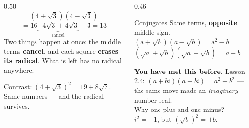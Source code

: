 \documentclass[aspectratio=169, 11pt]{beamer}
\begin{document}
\begin{frame}[t, plain]
  \begin{columns}[T]
    \begin{column}{0.50\textwidth}
      \[ \left(4+\sqrt3\right)\left(4-\sqrt3\right) \]
      \vspace{-14pt}
      \[ = 16 \underbrace{- 4\sqrt3 + 4\sqrt3}_{\text{cancel}} - 3 = 13 \]
      \vspace{-4pt}
      \footnotesize
      Two things happen at once: the middle terms \textbf{cancel}, and each square \textbf{erases
      its radical}. What is left has no radical anywhere.
      \vspace{6pt}

      {\footnotesize Contrast: $\left(4+\sqrt3\right)^{2}=19+8\sqrt3$. \; Same numbers --- and the
      radical survives.}
    \end{column}
    \begin{column}{0.46\textwidth}
      \begin{block}{Conjugates}
        \centering
        Same terms, \textbf{opposite} middle sign. \\[5pt]
        $\left(a+\sqrt b\right)\left(a-\sqrt b\right)=a^{2}-b$ \\[4pt]
        $\left(\sqrt a+\sqrt b\right)\left(\sqrt a-\sqrt b\right)=a-b$
      \end{block}
      \vspace{4pt}
      {\footnotesize \textbf{You have met this before.} Lesson 2.4:
      $(a+bi)(a-bi)=a^{2}+b^{2}$ --- the same move made an \emph{imaginary} number real. \\[4pt]
      Why one plus and one minus? \; $i^{2}=-1$, but $\left(\sqrt b\right)^{2}=+b$.}
    \end{column}
  \end{columns}
\end{frame}
\end{document}
